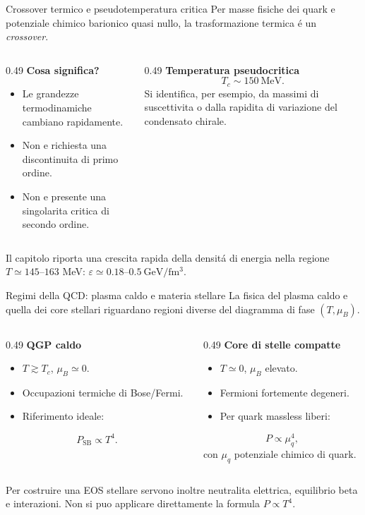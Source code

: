 \begin{frame}{Crossover termico e pseudotemperatura critica}
\small
Per masse fisiche dei quark e potenziale chimico barionico
quasi nullo, la trasformazione termica \'e un \emph{crossover}.
\begin{columns}[T,onlytextwidth]
\begin{column}{0.49\textwidth}
\textbf{Cosa significa?}
\begin{itemize}
\item Le grandezze termodinamiche
      cambiano rapidamente.
\item Non e richiesta una discontinuita
      di primo ordine.
\item Non e presente una singolarita
      critica di secondo ordine.
\end{itemize}
\end{column}
\begin{column}{0.49\textwidth}
\textbf{Temperatura pseudocritica}
\[
T_c\sim150\ \mathrm{MeV}.
\]
Si identifica, per esempio, da
massimi di suscettivita o dalla
rapidita di variazione del
condensato chirale.
\end{column}
\end{columns}
\medskip
Il capitolo riporta una crescita rapida della densit\'a di
energia nella regione $T\simeq145$--$163$ MeV:
$\varepsilon\simeq0.18$--$0.5\ \mathrm{GeV/fm^3}$.
\end{frame}

\begin{frame}{Regimi della QCD: plasma caldo e materia stellare}
\small
La fisica del plasma caldo e quella dei core stellari
riguardano regioni diverse del diagramma di fase $(T,\mu_B)$.
\begin{columns}[T,onlytextwidth]
\begin{column}{0.49\textwidth}
\textbf{QGP caldo}
\begin{itemize}
\item $T\gtrsim T_c$, $\mu_B\simeq0$.
\item Occupazioni termiche di Bose/Fermi.
\item Riferimento ideale:
\end{itemize}
\[
P_{\mathrm{SB}}\propto T^4.
\]
\end{column}
\begin{column}{0.49\textwidth}
\textbf{Core di stelle compatte}
\begin{itemize}
\item $T\simeq0$, $\mu_B$ elevato.
\item Fermioni fortemente degeneri.
\item Per quark massless liberi:
\end{itemize}
\[
P\propto\mu_q^4,
\]
con $\mu_q$ potenziale chimico di quark.
\end{column}
\end{columns}
\medskip
Per costruire una EOS stellare servono inoltre
neutralita elettrica, equilibrio beta e interazioni.
Non si puo applicare direttamente la formula $P\propto T^4$.
\end{frame}

